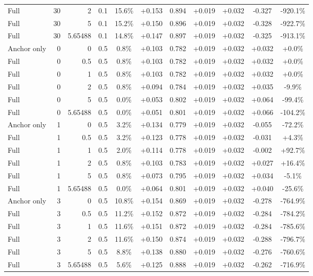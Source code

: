 \begin{table}[htbp]
\begin{tabular}{lrrrccccccc}
Full & 30 & 2 & 0.1 & 15.6\% & +0.153 & 0.894 & +0.019 & +0.032 & -0.327 & -920.1\% \\
Full & 30 & 5 & 0.1 & 15.2\% & +0.150 & 0.896 & +0.019 & +0.032 & -0.328 & -922.7\% \\
Full & 30 & 5.65488 & 0.1 & 14.8\% & +0.147 & 0.897 & +0.019 & +0.032 & -0.325 & -913.1\% \\
Anchor only & 0 & 0 & 0.5 & 0.8\% & +0.103 & 0.782 & +0.019 & +0.032 & +0.032 & +0.0\% \\
Full & 0 & 0.5 & 0.5 & 0.8\% & +0.103 & 0.782 & +0.019 & +0.032 & +0.032 & +0.0\% \\
Full & 0 & 1 & 0.5 & 0.8\% & +0.103 & 0.782 & +0.019 & +0.032 & +0.032 & +0.0\% \\
Full & 0 & 2 & 0.5 & 0.8\% & +0.094 & 0.784 & +0.019 & +0.032 & +0.035 & -9.9\% \\
Full & 0 & 5 & 0.5 & 0.0\% & +0.053 & 0.802 & +0.019 & +0.032 & +0.064 & -99.4\% \\
Full & 0 & 5.65488 & 0.5 & 0.0\% & +0.051 & 0.801 & +0.019 & +0.032 & +0.066 & -104.2\% \\
Anchor only & 1 & 0 & 0.5 & 3.2\% & +0.134 & 0.779 & +0.019 & +0.032 & -0.055 & -72.2\% \\
Full & 1 & 0.5 & 0.5 & 3.2\% & +0.123 & 0.778 & +0.019 & +0.032 & -0.031 & +4.3\% \\
Full & 1 & 1 & 0.5 & 2.0\% & +0.114 & 0.778 & +0.019 & +0.032 & -0.002 & +92.7\% \\
Full & 1 & 2 & 0.5 & 0.8\% & +0.103 & 0.783 & +0.019 & +0.032 & +0.027 & +16.4\% \\
Full & 1 & 5 & 0.5 & 0.8\% & +0.073 & 0.795 & +0.019 & +0.032 & +0.034 & -5.1\% \\
Full & 1 & 5.65488 & 0.5 & 0.0\% & +0.064 & 0.801 & +0.019 & +0.032 & +0.040 & -25.6\% \\
Anchor only & 3 & 0 & 0.5 & 10.8\% & +0.154 & 0.869 & +0.019 & +0.032 & -0.278 & -764.9\% \\
Full & 3 & 0.5 & 0.5 & 11.2\% & +0.152 & 0.872 & +0.019 & +0.032 & -0.284 & -784.2\% \\
Full & 3 & 1 & 0.5 & 11.6\% & +0.151 & 0.872 & +0.019 & +0.032 & -0.284 & -785.6\% \\
Full & 3 & 2 & 0.5 & 11.6\% & +0.150 & 0.874 & +0.019 & +0.032 & -0.288 & -796.7\% \\
Full & 3 & 5 & 0.5 & 8.8\% & +0.138 & 0.880 & +0.019 & +0.032 & -0.276 & -760.6\% \\
Full & 3 & 5.65488 & 0.5 & 5.6\% & +0.125 & 0.888 & +0.019 & +0.032 & -0.262 & -716.9\% \\

\end{tabular}
\end{table}
